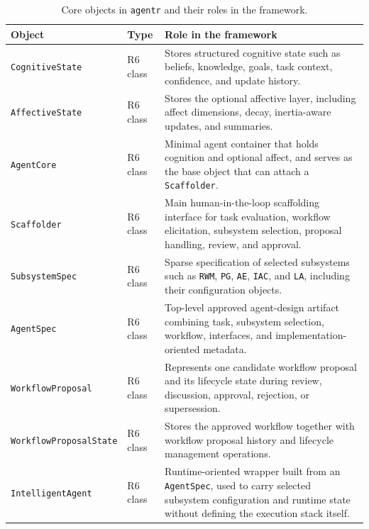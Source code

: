 \begin{table}[htbp]
\centering
\caption{Core objects in \texttt{agentr} and their roles in the framework.}
\begin{tabular}{p{3.2cm} p{2.4cm} p{8.2cm}}
\hline
\textbf{Object} & \textbf{Type} & \textbf{Role in the framework} \\
\hline
\texttt{CognitiveState} & R6 class & Stores structured cognitive state such as beliefs, knowledge, goals, task context, confidence, and update history. \\
\texttt{AffectiveState} & R6 class & Stores the optional affective layer, including affect dimensions, decay, inertia-aware updates, and summaries. \\
\texttt{AgentCore} & R6 class & Minimal agent container that holds cognition and optional affect, and serves as the base object that can attach a \texttt{Scaffolder}. \\
\texttt{Scaffolder} & R6 class & Main human-in-the-loop scaffolding interface for task evaluation, workflow elicitation, subsystem selection, proposal handling, review, and approval. \\
\texttt{SubsystemSpec} & R6 class & Sparse specification of selected subsystems such as \texttt{RWM}, \texttt{PG}, \texttt{AE}, \texttt{IAC}, and \texttt{LA}, including their configuration objects. \\
\texttt{AgentSpec} & R6 class & Top-level approved agent-design artifact combining task, subsystem selection, workflow, interfaces, and implementation-oriented metadata. \\
\texttt{WorkflowProposal} & R6 class & Represents one candidate workflow proposal and its lifecycle state during review, discussion, approval, rejection, or supersession. \\
\texttt{WorkflowProposalState} & R6 class & Stores the approved workflow together with workflow proposal history and lifecycle management operations. \\
\texttt{IntelligentAgent} & R6 class & Runtime-oriented wrapper built from an \texttt{AgentSpec}, used to carry selected subsystem configuration and runtime state without defining the execution stack itself. \\
\hline
\end{tabular}
\end{table}
